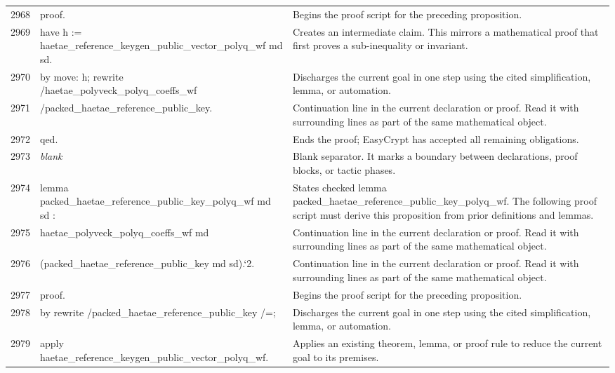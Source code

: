 \documentclass[10pt]{article}
\begin{document}
\begin{longtable}{r L{0.53\textwidth} L{0.37\textwidth}}
2968 & {\ttfamily\scriptsize proof.} & Begins the proof script for the preceding proposition. \\
2969 & {\ttfamily\scriptsize have h := haetae\_reference\_keygen\_public\_vector\_polyq\_wf md sd.} & Creates an intermediate claim.  This mirrors a mathematical proof that first proves a sub-inequality or invariant. \\
2970 & {\ttfamily\scriptsize by move: h; rewrite /haetae\_polyveck\_polyq\_coeffs\_wf} & Discharges the current goal in one step using the cited simplification, lemma, or automation. \\
2971 & {\ttfamily\scriptsize                     /packed\_haetae\_reference\_public\_key.} & Continuation line in the current declaration or proof.  Read it with surrounding lines as part of the same mathematical object. \\
2972 & {\ttfamily\scriptsize qed.} & Ends the proof; EasyCrypt has accepted all remaining obligations. \\
2973 & {\ttfamily\scriptsize \emph{blank}} & Blank separator.  It marks a boundary between declarations, proof blocks, or tactic phases. \\
2974 & {\ttfamily\scriptsize lemma packed\_haetae\_reference\_public\_key\_polyq\_wf md sd :} & States checked lemma packed\_haetae\_reference\_public\_key\_polyq\_wf.  The following proof script must derive this proposition from prior definitions and lemmas. \\
2975 & {\ttfamily\scriptsize   haetae\_polyveck\_polyq\_coeffs\_wf md} & Continuation line in the current declaration or proof.  Read it with surrounding lines as part of the same mathematical object. \\
2976 & {\ttfamily\scriptsize     (packed\_haetae\_reference\_public\_key md sd).`2.} & Continuation line in the current declaration or proof.  Read it with surrounding lines as part of the same mathematical object. \\
2977 & {\ttfamily\scriptsize proof.} & Begins the proof script for the preceding proposition. \\
2978 & {\ttfamily\scriptsize by rewrite /packed\_haetae\_reference\_public\_key /=;} & Discharges the current goal in one step using the cited simplification, lemma, or automation. \\
2979 & {\ttfamily\scriptsize    apply haetae\_reference\_keygen\_public\_vector\_polyq\_wf.} & Applies an existing theorem, lemma, or proof rule to reduce the current goal to its premises. \\

\end{longtable}
\end{document}
